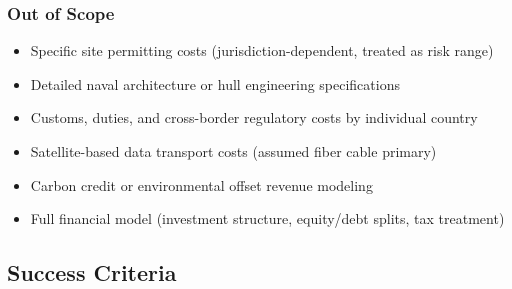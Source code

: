 \documentclass[11pt,letterpaper]{article}
\begin{document}
\subsubsection{Out of Scope}
\begin{itemize}[itemsep=2pt]
  \item Specific site permitting costs (jurisdiction-dependent, treated as risk range)
  \item Detailed naval architecture or hull engineering specifications
  \item Customs, duties, and cross-border regulatory costs by individual country
  \item Satellite-based data transport costs (assumed fiber cable primary)
  \item Carbon credit or environmental offset revenue modeling
  \item Full financial model (investment structure, equity/debt splits, tax treatment)
\end{itemize}

\subsection{Success Criteria}
\end{document}
